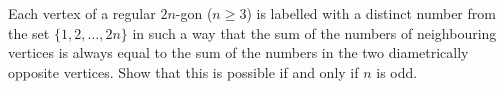 Each vertex of a regular $2n$-gon ($n \geq 3$) is labelled with a distinct number
from the set $\{1,2,\ldots,2n\}$ in such a way that the sum of the numbers of neighbouring
vertices is always equal to the sum of the numbers in the two diametrically opposite vertices.
Show that this is possible if and only if $n$ is odd.
